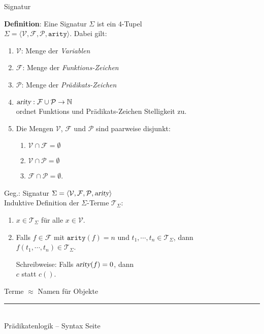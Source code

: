 \documentclass{slides}
\newcommand{\myrule}{\rule{20cm}{1mm}\\ }
\newcounter{mypage}
\begin{document}
\begin{slide}{}
\normalsize
\begin{center}
Signatur
\end{center}
\vspace{0.5cm}

\footnotesize
\textbf{Definition}: Eine Signatur $\Sigma$ ist ein $4$-Tupel  \\[0.3cm]
\hspace*{1.3cm} $\Sigma = \langle \mathcal{V}, \mathcal{F}, \mathcal{P},
\mathtt{arity}\rangle$.  \quad
Dabei gilt:
\begin{enumerate}
\item $\mathcal{V}$:  Menge der \emph{Variablen}
\item $\mathcal{F}$:  Menge der \emph{Funktions-Zeichen}
\item $\mathcal{P}$:  Menge der \emph{Pr\"{a}dikats-Zeichen}
\item $\textsl{arity}: \mathcal{F} \cup \mathcal{P} \rightarrow \mathbb{N}$ \\[0.1cm]
      ordnet Funktions und Pr\"{a}dikats-Zeichen Stelligkeit zu.
\item Die Mengen $\mathcal{V}$, $\mathcal{F}$ und $\mathcal{P}$ sind paarweise disjunkt: 
      \begin{enumerate}
      \item $\mathcal{V} \cap \mathcal{F} = \emptyset$
      \item $\mathcal{V} \cap \mathcal{P} = \emptyset$
      \item $\mathcal{F} \cap \mathcal{P} = \emptyset$.
      \end{enumerate}
\end{enumerate}

Geg.: Signatur $\Sigma = \langle \mathcal{V}, \mathcal{F}, \mathcal{P}, \textsl{arity}\rangle$ \\[0.3cm]
\hspace*{1.3cm} 
Induktive Definition der $\Sigma$-Terme $\mathcal{T}_\Sigma$:
\begin{enumerate}
\item $x \in \mathcal{T}_\Sigma$ \quad f\"{u}r alle $x \in \mathcal{V}$.
\item Falls $f \in \mathcal{F}$ mit $\mathtt{arity}(f) = n$  und $t_1,\cdots,t_n \in\mathcal{T}_\Sigma$, dann  \\[0.1cm]
      \hspace*{1.3cm} $f(t_1,\cdots,t_n) \in \mathcal{T}_\Sigma$.
 
      Schreibweise: Falls $\textsl{arity}(f) = 0$, dann \\[0.1cm]
      \hspace*{1.3cm} $c$ \quad statt \quad $c()$.
\end{enumerate}
\begin{center}
{\normalsize
Terme $\approx$ Namen f\"{u}r Objekte }
\end{center}

\vspace*{\fill}
\tiny \addtocounter{mypage}{1}
\myrule
Pr\"{a}dikatenlogik -- Syntax  \hspace*{\fill} Seite 
\end{slide}
\end{document}
